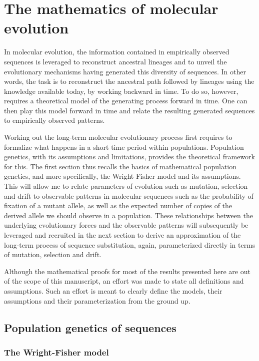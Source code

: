 \thispagestyle{empty}
\chapter{The mathematics of molecular evolution}
{\hypersetup{linkcolor=GREYDARK}\minitoc}
\label{chap:intro-formalism}

In molecular evolution, the information contained in empirically observed sequences is leveraged to reconstruct ancestral lineages and to unveil the evolutionary mechanisms having generated this diversity of sequences.
In other words, the task is to reconstruct the ancestral path followed by lineages using the knowledge available today, by working backward in time.
To do so, however, requires a theoretical model of the generating process forward in time.
One can then play this model forward in time and relate the resulting generated sequences to empirically observed patterns.

Working out the long-term molecular evolutionary process first requires to formalize what happens in a short time period within populations.
Population genetics, with its assumptions and limitations, provides the theoretical framework for this.
The first section thus recalls the basics of mathematical population genetics, and more specifically, the Wright-Fisher model and its assumptions.
This will allow me to relate parameters of evolution such as mutation, selection and drift to observable patterns in molecular sequences such as the probability of fixation of a mutant \gls{allele}, as well as the expected number of copies of the derived \gls{allele} we should observe in a population.
These relationships between the underlying evolutionary forces and the observable patterns will subsequently be leveraged and recruited in the next section to derive an approximation of the long-term process of sequence \gls{substitution}, again, parameterized directly in terms of mutation, selection and drift.

Although the mathematical proofs for most of the results presented here are out of the scope of this manuscript, an effort was made to state all definitions and assumptions.
Such an effort is meant to clearly define the models, their assumptions and their parameterization from the ground up.


\section{Population genetics of sequences}

\subsection{The Wright-Fisher model}

